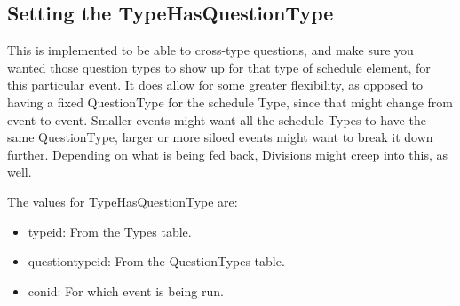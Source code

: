 \documentclass[captions=tablesignature]{scrartcl}
\begin{document}
\subsection{Setting the TypeHasQuestionType}
\label{sec-14-3}
This is implemented to be able to cross-type questions, and make
sure you wanted those question types to show up for that type of
schedule element, for this particular event.  It does allow for
some greater flexibility, as opposed to having a fixed QuestionType
for the schedule Type, since that might change from event to event.
Smaller events might want all the schedule Types to have the same
QuestionType, larger or more siloed events might want to break it
down further.  Depending on what is being fed back, Divisions might
creep into this, as well.

The values for TypeHasQuestionType are:
\begin{itemize}
\item typeid: From the Types table.
\item questiontypeid: From the QuestionTypes table.
\item conid: For which event is being run.
\end{itemize}
\end{document}
